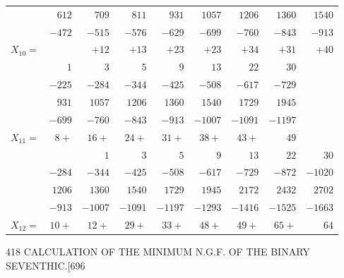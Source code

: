 \documentclass[11pt]{article}
\begin{document}
\begin{center}
\begin{tabular}{l|rrrrrrrr}
            & $612$   & $709$   & $811$   & $931$   & $1057$  & $1206$    & $1360$    & $1540$\\
            & $-472$  & $-515$  & $-576$  & $-629$  & $-699$  & $-760$    & $-843$    & $-913$\\
$X_{10}=$   &         & $+12$   & $+13$   & $+23$   & $+23$   & $+34$     & $+31$     & $+40$ \\\hline
            & $1$     & $3$     & $5$     & $9$     & $13$    & $22$      & $30$      &       \\
            & $-225$  & $-284$  & $-344$  & $-425$  & $-508$  & $-617$    & $-729$    &       \\
            & $931$   & $1057$  & $1206$  & $1360$  & $1540$  & $1729$    & $1945$    &       \\
            & $-699$  & $-760$  & $-843$  & $-913$  & $-1007$ & $-1091$   & $-1197$   &       \\
$X_{11}=$   & $8+$    & $16+$   & $24+$   & $31+$   & $38+$   & $43+$     & $49$      &       \\\hline
            &         & $1$     & $3$     & $5$     & $9$     & $13$      & $22$      & $30$  \\
            & $-284$  & $-344$  & $-425$  & $-508$  & $-617$  & $-729$    & $-872$    & $-1020$\\
            & $1206$  & $1360$  & $1540$  & $1729$  & $1945$  & $2172$    & $2432$    & $2702$\\
            & $-913$  & $-1007$ & $-1091$ & $-1197$ & $-1293$ & $-1416$   & $-1525$   & $-1663$\\
$X_{12}=$   & $10+$   & $12+$   & $29+$   & $33+$   & $48+$   & $49+$     & $65+$     & $64$  \\
\end{tabular}
\end{center}

\clearpage
\begin{center}\small 418 \hfill CALCULATION OF THE MINIMUM N.G.F. OF THE BINARY SEVENTHIC.\hfill [696\end{center}
\end{document}
